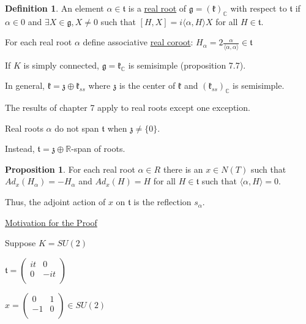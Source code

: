 \documentclass{article}
\theoremstyle{definition}
\newtheorem{definition}{Definition}
\newtheorem{proposition}{Proposition}
\begin{document}
\begin{definition}
    An element \(\alpha \in \mathfrak{t}\) is a \underline{real root} of \(\mathfrak{g} = (\mathfrak{k})_\mathbb{C}\) with respect to \(\mathfrak{t}\) if \(\alpha \in 0\) and \(\exists X\in \mathfrak{g}, X \neq 0\) such that \([H,X]=i \langle \alpha , H \rangle X\) for all \(H\in \mathfrak{t}\).
    
    For each real root \(\alpha\) define associative \underline{real coroot}: \(H_\alpha = 2 \frac{\alpha}{\langle \alpha , \alpha  \rangle }\in \mathfrak{t}\) 

    If \(K\) is simply connected, \(\mathfrak{g}=\mathfrak{k}_\mathbb{C}\) is semisimple (proposition 7.7).

    In general, \(\mathfrak{k} = \mathfrak{z} \oplus \mathfrak{k}_{s s}\) where \(\mathfrak{z}\) is the center of \(\mathfrak{k}\) and \((\mathfrak{k}_{s s})_\mathbb{C}\) is semisimple.   
    
\end{definition}

The results of chapter 7 apply to real roots except one exception.

Real roots \(\alpha\) do not span \(\mathfrak{t}\) when \(\mathfrak{z} \neq \{ 0 \}\).

Instead, \(\mathfrak{t} = \mathfrak{z} \oplus \mathbb{R}\)-span of roots.

\begin{proposition}
    For each real root \(\alpha \in R\) there is an \(x\in N(T)\) such that \(Ad_x(H_\alpha)=-H_\alpha\) and \(Ad_x(H)=H\) for all \(H\in \mathfrak{t}\) such that \(\langle \alpha ,H \rangle = 0 \).
    
    Thus, the adjoint action of \(x\) on \(\mathfrak{t}\) is the reflection \(s_\alpha\).  
\end{proposition}

\underline{Motivation for the Proof}

Suppose \(K=SU(2)\)

\(\mathfrak{t} = \begin{pmatrix}
    it &  0 \\
    0 &  -it \\
\end{pmatrix}\)

\(x = \begin{pmatrix}
    0 &  1 \\
    -1 &  0 \\
\end{pmatrix}\in SU(2)\)
\end{document}
